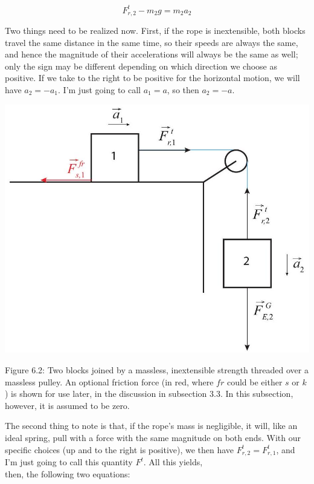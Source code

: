 \documentclass[10pt]{article}
\begin{document}
\begin{equation*}
F_{r, 2}^{t}-m_{2} g=m_{2} a_{2} \tag{6.22}
\end{equation*}


Two things need to be realized now. First, if the rope is inextensible, both blocks travel the same distance in the same time, so their speeds are always the same, and hence the magnitude of their accelerations will always be the same as well; only the sign may be different depending on which direction we choose as positive. If we take to the right to be positive for the horizontal motion, we will have $a_{2}=-a_{1}$. I'm just going to call $a_{1}=a$, so then $a_{2}=-a$.

\begin{center}
\includegraphics[max width=\textwidth]{2024_09_14_9969b06773f10b6936e8g-139}
\end{center}

Figure 6.2: Two blocks joined by a massless, inextensible strength threaded over a massless pulley. An optional friction force (in red, where $f r$ could be either $s$ or $k$ ) is shown for use later, in the discussion in subsection 3.3. In this subsection, however, it is assumed to be zero.

The second thing to note is that, if the rope's mass is negligible, it will, like an ideal spring, pull with a force with the same magnitude on both ends. With our specific choices (up and to the right is positive), we then have $F_{r, 2}^{t}=F_{r, 1}^{t}$, and I'm just going to call this quantity $F^{t}$. All this yields,\\
then, the following two equations:
\end{document}
